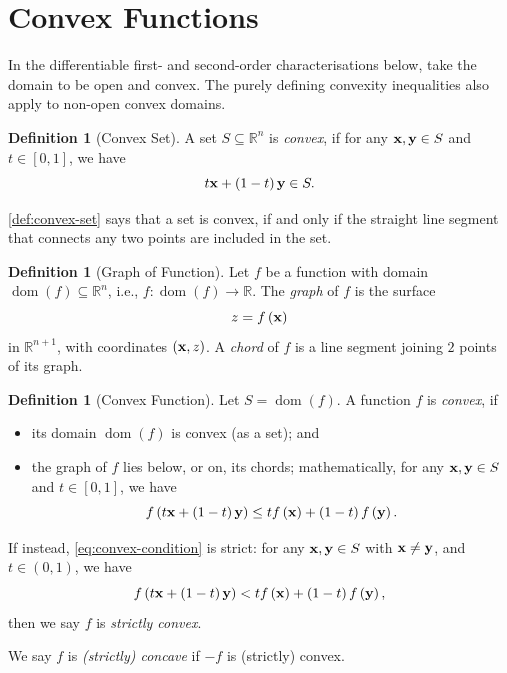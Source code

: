 \documentclass[11pt]{article}
\numberwithin{equation}{section}
\theoremstyle{definition}
\newtheorem{definition}[theorem]{Definition}
\theoremstyle{remark}
\newcommand{\pqty}[1]{\left(#1\right)}
\newcommand{\ccintv}[2]{[#1,#2]}
\newcommand{\oointv}[2]{(#1,#2)}
\newcommand{\functiondomain}[3]{#1:#2\to #3}
\newcommand{\RR}{\mathbb{R}}
\DeclareMathOperator{\dom}{dom}
\begin{document}
\section{Convex Functions}
In the differentiable first- and second-order characterisations below, take the domain to be open and convex. The purely defining convexity inequalities also apply to non-open convex domains.

\begin{definition}[Convex Set]\label{variation-unit-0008}
    \label{def:convex-set}%
    A set \(S \subseteq \RR^n\) is \emph{convex}, if for any \(\vb{x}, \vb{y} \in S\) and \(t \in \ccintv{0}{1}\), we have
    \[
        t \vb{x} + \pqty{1 - t} \vb{y} \in S.
    \]
\end{definition}

\autoref{def:convex-set} says that a set is convex, if and only if the straight line segment that connects any two points are included in the set.

\begin{definition}[Graph of Function]\label{variation-unit-0009}
    \label{def:graph-of-fn}%
    Let \(f\) be a function with domain \(\dom\pqty{f} \subseteq \RR^n\), i.e., \(\functiondomain{f}{\dom\pqty{f}}{\RR}\). The \emph{graph} of \(f\) is the surface
    \[
        z = f\pqty{\vb{x}}
    \]
    in \(\RR^{n + 1}\), with coordinates \(\pqty{\vb{x}, z}\). A \emph{chord} of \(f\) is a line segment joining \(2\) points of its graph.
\end{definition}

\begin{definition}[Convex Function]\label{variation-unit-0010}
    \label{def:convex-function}%
    Let \(S=\dom(f)\). A function \(f\) is \emph{convex}, if
    \begin{itemize}
        \item its domain \(\dom\pqty{f}\) is convex (as a set); and
        \item the graph of \(f\) lies below, or on, its chords; mathematically, for any \(\vb{x}, \vb{y} \in S\) and \(t \in \ccintv{0}{1}\), we have
        \begin{equation}
            f\pqty{t \vb{x} + \pqty{1 - t} \vb{y}} \leq t f\pqty{\vb{x}} + \pqty{1 - t} f\pqty{\vb{y}}. \label{eq:convex-condition}
        \end{equation}
    \end{itemize}

    If instead, \autoref{eq:convex-condition} is strict: for any \(\vb{x}, \vb{y} \in S\) with \(\vb{x} \neq \vb{y}\), and \(t \in \oointv{0}{1}\), we have
    \begin{equation}
        f\pqty{t \vb{x} + \pqty{1 - t} \vb{y}} < t f\pqty{\vb{x}} + \pqty{1 - t} f\pqty{\vb{y}}, \label{eq:strict-convex-condition}
    \end{equation}
    then we say \(f\) is \emph{strictly convex}.

    We say \(f\) is \emph{(strictly) concave} if \(-f\) is (strictly) convex.
\end{definition}
\end{document}
